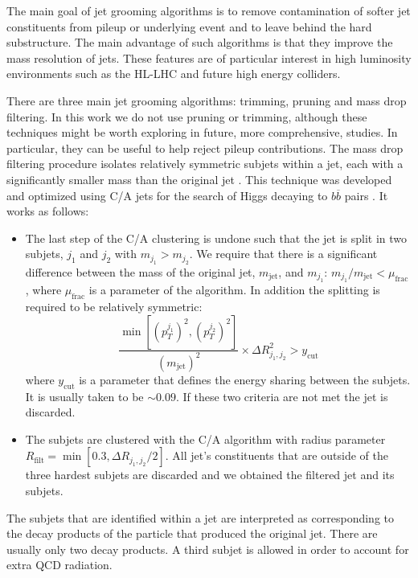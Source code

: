 The main goal of jet grooming algorithms is to remove contamination of softer jet constituents from pileup or underlying event and to leave behind the hard substructure. The main advantage of such algorithms is that they improve the mass resolution of jets. These features are of particular interest in high luminosity environments such as the HL-LHC and future high energy colliders. 

There are three main jet grooming algorithms: trimming, pruning and mass drop filtering. In this work we do not use pruning or trimming, although these techniques might be worth exploring in future, more comprehensive, studies. In particular, they can be useful to help reject pileup contributions. The mass drop filtering procedure isolates relatively symmetric subjets within a jet, each with a significantly smaller mass than the original jet \cite{jetsub}. This technique was developed and optimized using C/A jets for the search of Higgs decaying to $b\overline{b}$ pairs \cite{BDRS}. It works as follows:
\begin{itemize}
	\item The last step of the C/A clustering is undone such that the jet is split in two subjets, $j_1$ and $j_2$ with $m_{j_1}>m_{j_2}$. We require that there is a significant difference between the mass of the original jet, $m_{\text{jet}}$, and $m_{j_1}$: $m_{j_1}/m_{\text{jet}} < \mu_{\text{frac}}$, where $\mu_{\text{frac}}$ is a parameter of the algorithm. In addition the splitting is required to be relatively symmetric:
	\begin{equation}
		\frac{\min[(p_T^{j_1})^2,(p_T^{j_2})^2]}{(m_{\text{jet}})^2} \times \Delta R_{j_1,j_2}^2 > y_{\text{cut}}
	\end{equation}
	where $y_{\text{cut}}$ is a parameter that defines the energy sharing between the subjets. It is usually taken to be $\sim 0.09$. If these two criteria are not met the jet is discarded.
	
	\item The subjets are clustered with the C/A algorithm with radius parameter $R_{\text{filt}}=\min[0.3,\Delta R_{j_1,j_2}/2]$. All jet's constituents that are outside of the three hardest subjets are discarded and we obtained the filtered jet and its subjets.
\end{itemize}

The subjets that are identified within a jet are interpreted as corresponding to the decay products of the particle that produced the original jet. There are usually only two decay products. A third subjet is allowed in order to account for extra QCD radiation.

